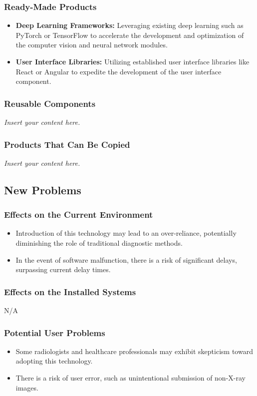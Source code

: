 \documentclass[12pt]{article}
\newcommand{\lips}{\textit{Insert your content here.}}
\begin{document}
\subsubsection{Ready-Made Products}
\begin{itemize}
    \item \textbf{Deep Learning Frameworks:} Leveraging existing deep learning such as PyTorch or TensorFlow to accelerate the development and optimization of the computer vision and neural network modules.
    \item \textbf{User Interface Libraries:} Utilizing established user interface libraries like React or Angular to expedite the development of the user interface component.
\end{itemize}
\subsubsection{Reusable Components}
\lips
\subsubsection{Products That Can Be Copied}
\lips

\subsection{New Problems}

\subsubsection{Effects on the Current Environment}
\begin{itemize}
    \item Introduction of this technology may lead to an over-reliance, potentially diminishing the role of traditional diagnostic methods. 
    \item In the event of software malfunction, there is a risk of significant delays, surpassing current delay times. 
\end{itemize}
\subsubsection{Effects on the Installed Systems}
    N/A
\subsubsection{Potential User Problems}
\begin{itemize}
    \item Some radiologists and healthcare professionals may exhibit skepticism toward adopting this technology.
    \item There is a risk of user error, such as unintentional submission of non-X-ray images. 
\end{itemize}
\end{document}
